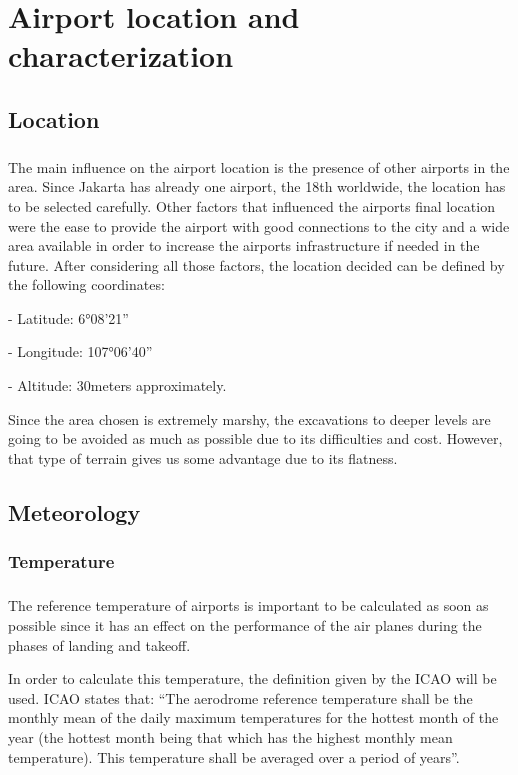 \chapter{Airport location and characterization}
	\section{Location}
\paragraph{} The main influence on the airport location is the presence of other airports in the area. Since
Jakarta has already one airport, the 18th worldwide, the location has to be selected carefully.
Other factors that influenced the airports final location were the ease to provide the airport
with good connections to the city and a wide area available in order to increase the airports
infrastructure if needed in the future.
After considering all those factors, the location decided can be defined by the following coordinates:

- Latitude: 6°08'21''

- Longitude: 107°06'40''

- Altitude: 30meters approximately.

Since the area chosen is extremely marshy, the excavations to deeper levels are going to be
avoided as much as possible due to its difficulties and cost. However, that type of terrain gives
us some advantage due to its flatness.
	\section{Meteorology}
		\subsection{Temperature}
		\paragraph{}The reference temperature of airports is important to be calculated as soon as possible since it has an effect on the performance of the air planes during the phases of landing and takeoff. 
		
		In order to calculate this temperature, the definition given by the ICAO will be used. ICAO states that: “The aerodrome reference temperature shall be the monthly mean of the daily maximum temperatures for the hottest month of the year (the hottest month being that which has the highest monthly mean temperature). This temperature shall be averaged over a period of years”.
		
